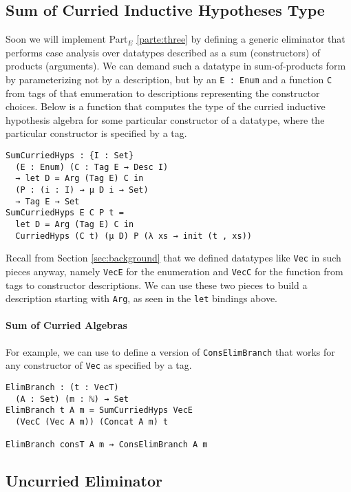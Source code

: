 \documentclass[nonatbib]{sigplanconf}
\newcommand{\refsec}[1]{Section \ref{sec:#1}}
\newcommand{\refparte}[1]{Part$_E$ \ref{parte:#1}}
\begin{document}
\subsection{Sum of Curried Inductive Hypotheses Type}
\label{sec:elim:sum}

Soon we will implement \refparte{three} by defining a generic eliminator
that performs case analysis over datatypes described as a
sum (constructors) of products (arguments). We can demand such a
datatype in sum-of-products form by parameterizing not by a description,
but by an {\tt E : Enum} and a function {\tt C} from tags of that enumeration to
descriptions representing the constructor choices. Below is a function
that computes the type of the curried inductive hypothesis algebra for
some particular constructor of a datatype, where the particular
constructor is specified by a tag.

\begin{verbatim}
SumCurriedHyps : {I : Set}
  (E : Enum) (C : Tag E → Desc I)
  → let D = Arg (Tag E) C in
  (P : (i : I) → μ D i → Set)
  → Tag E → Set
SumCurriedHyps E C P t =
  let D = Arg (Tag E) C in
  CurriedHyps (C t) (μ D) P (λ xs → init (t , xs))
\end{verbatim}


Recall from
\refsec{background} that we defined datatypes like {\tt Vec} in such
pieces anyway, namely {\tt VecE} for the enumeration and {\tt VecC}
for the function from tags to constructor descriptions.
We can use these two
pieces to build a description starting with {\tt Arg}, as seen in the
{\tt let} bindings above.

\paragraph{Sum of Curried Algebras}

For example, we can use 
to define a version of
{\tt ConsElimBranch} that works for any constructor of {\tt Vec} as
specified by a tag.

\begin{verbatim}
ElimBranch : (t : VecT)
  (A : Set) (m : ℕ) → Set
ElimBranch t A m = SumCurriedHyps VecE
  (VecC (Vec A m)) (Concat A m) t

ElimBranch consT A m ⇝ ConsElimBranch A m
\end{verbatim}

\subsection{Uncurried Eliminator}
\end{document}
